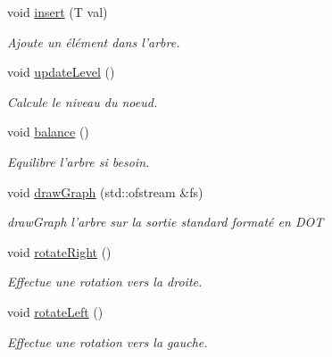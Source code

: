 \begin{DoxyCompactItemize}
void \hyperlink{class_a_v_l_aa6459425ad7772fe9bff79caadeac7d4}{insert} (T val)
\begin{DoxyCompactList}\small\item\em Ajoute un élément dans l'arbre. \end{DoxyCompactList}\item 
void \hyperlink{class_a_v_l_adcea8d3f61ef24eef897e3cdf4952374}{update\-Level} ()
\begin{DoxyCompactList}\small\item\em Calcule le niveau du noeud. \end{DoxyCompactList}\item 
void \hyperlink{class_a_v_l_a88990625197e11f57df2e7bcf559e8f9}{balance} ()
\begin{DoxyCompactList}\small\item\em Equilibre l'arbre si besoin. \end{DoxyCompactList}\item 
void \hyperlink{class_a_v_l_ac9656f86066f929391364edd6e23083f}{draw\-Graph} (std\-::ofstream \&fs)
\begin{DoxyCompactList}\small\item\em draw\-Graph l'arbre sur la sortie standard formaté en D\-O\-T \end{DoxyCompactList}\item 
void \hyperlink{class_a_v_l_a4785b0ae1023d3dee584ffbbc45057a3}{rotate\-Right} ()
\begin{DoxyCompactList}\small\item\em Effectue une rotation vers la droite. \end{DoxyCompactList}\item 
void \hyperlink{class_a_v_l_ac972995f3084d8876eb143916ccf8f8e}{rotate\-Left} ()
\begin{DoxyCompactList}\small\item\em Effectue une rotation vers la gauche. \end{DoxyCompactList}\end{DoxyCompactItemize}

